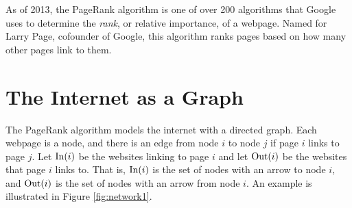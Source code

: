 \label{lab:PageRank}

As of 2013, the PageRank algorithm is one of over 200 algorithms that Google uses to determine the \emph{rank}, or relative importance, of a webpage.
Named for Larry Page, cofounder of Google, this algorithm ranks pages based on how many other pages link to them.

\section*{The Internet as a Graph}
The PageRank algorithm models the internet with a directed graph.
Each webpage is a node, and there is an edge from node $i$ to node $j$ if page $i$ links to page $j$.
Let $\operatorname{In}(i)$ be the websites linking to page $i$ and let $\operatorname{Out}(i)$ be the websites that page $i$ links to.
That is, $\operatorname{In}(i)$ is the set of nodes with an arrow to node $i$, and $\operatorname{Out}(i)$ is the set of nodes with an arrow from node $i$.
An example is illustrated in Figure \ref{fig:network1}.

